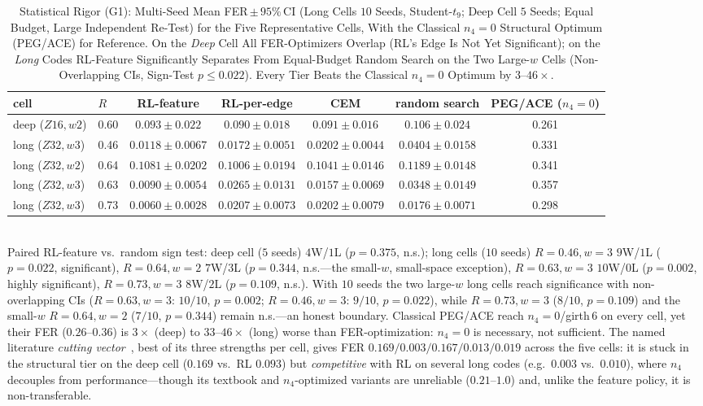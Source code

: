 \documentclass[journal]{IEEEtran}
\begin{document}
\begin{table}[t]
\centering
\caption{Statistical Rigor (G1): Multi-Seed Mean FER\,$\pm$\,$95\%$\,CI (Long
Cells $10$ Seeds, Student-$t_9$; Deep Cell $5$ Seeds; Equal Budget, Large
Independent Re-Test) for the Five Representative Cells, With the Classical
$n_4{=}0$ Structural Optimum (PEG/ACE) for Reference. On the \emph{Deep} Cell All
FER-Optimizers Overlap (RL's Edge Is Not Yet Significant); on the \emph{Long}
Codes RL-Feature Significantly Separates From Equal-Budget Random Search on the
Two Large-$w$ Cells (Non-Overlapping CIs, Sign-Test $p\le0.022$).
Every Tier Beats the Classical $n_4{=}0$ Optimum by $3$--$46\times$.}
\label{tab:ci}
\renewcommand{\arraystretch}{1.2}
\setlength{\tabcolsep}{6pt}
\footnotesize
\begin{tabular}{@{}llccccc@{}}
\toprule
cell & $R$ & RL-feature & RL-per-edge & CEM & random search & PEG/ACE ($n_4{=}0$)\\
\midrule
deep ($Z16,w2$)   & 0.60 & $0.093\pm0.022$ & $0.090\pm0.018$ & $0.091\pm0.016$ & $0.106\pm0.024$ & 0.261\\
long ($Z32,w3$)   & 0.46 & $\mathbf{0.0118}\pm0.0067$ & $0.0172\pm0.0051$ & $0.0202\pm0.0044$ & $0.0404\pm0.0158$ & 0.331\\
long ($Z32,w2$)   & 0.64 & $0.1081\pm0.0202$ & $\mathbf{0.1006}\pm0.0194$ & $0.1041\pm0.0146$ & $0.1189\pm0.0148$ & 0.341\\
long ($Z32,w3$)   & 0.63 & $\mathbf{0.0090}\pm0.0054$ & $0.0265\pm0.0131$ & $0.0157\pm0.0069$ & $0.0348\pm0.0149$ & 0.357\\
long ($Z32,w3$)   & 0.73 & $\mathbf{0.0060}\pm0.0028$ & $0.0207\pm0.0073$ & $0.0202\pm0.0079$ & $0.0176\pm0.0071$ & 0.298\\
\bottomrule
\end{tabular}
\\[3pt]
{\footnotesize Paired RL-feature vs.\ random sign test: deep cell ($5$ seeds)
$4$W/$1$L ($p{=}0.375$, n.s.); long cells ($10$ seeds) $R{=}0.46,w{=}3$
$9$W/$1$L ($p{=}0.022$, significant), $R{=}0.64,w{=}2$ $7$W/$3$L ($p{=}0.344$,
n.s.---the small-$w$, small-space exception), $R{=}0.63,w{=}3$ $10$W/$0$L
($p{=}0.002$, highly significant), $R{=}0.73,w{=}3$ $8$W/$2$L ($p{=}0.109$, n.s.).
With $10$ seeds the two large-$w$ long cells reach significance with
non-overlapping CIs ($R{=}0.63,w{=}3$: $10/10$, $p{=}0.002$; $R{=}0.46,w{=}3$:
$9/10$, $p{=}0.022$), while $R{=}0.73,w{=}3$ ($8/10$, $p{=}0.109$) and the
small-$w$ $R{=}0.64,w{=}2$ ($7/10$, $p{=}0.344$) remain n.s.---an honest
boundary. Classical PEG/ACE reach $n_4{=}0$/girth\,$6$
on every cell, yet their FER ($0.26$--$0.36$) is $3\times$ (deep) to
$33$--$46\times$ (long) worse than FER-optimization: $n_4{=}0$ is necessary,
not sufficient. The named literature \emph{cutting vector}~\cite{mitchell2015scldpc},
best of its three strengths per cell, gives FER $0.169/0.003/0.167/0.013/0.019$
across the five cells: it is stuck in the structural tier on the deep cell
($0.169$ vs.\ RL $0.093$) but \emph{competitive} with RL on several long codes
(e.g.\ $0.003$ vs.\ $0.010$), where $n_4$ decouples from performance---though its
textbook and $n_4$-optimized variants are unreliable ($0.21$--$1.0$) and, unlike
the feature policy, it is non-transferable.}
\end{table}
\end{document}
